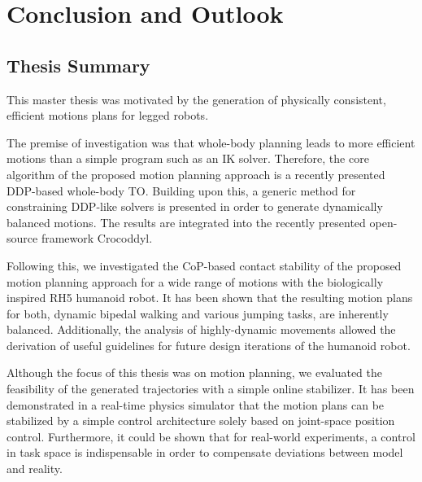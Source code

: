 
\chapter{Conclusion and Outlook}\label{c7}

\section{Thesis Summary}
This master thesis was motivated by the generation of physically consistent, efficient motions plans for legged robots. 

The premise of investigation was that whole-body planning leads to more efficient motions than a simple program such as an \gls{IK} solver. Therefore, the core algorithm of the proposed motion planning approach is a recently presented \gls{DDP}-based whole-body \gls{TO}. Building upon this, a generic method for constraining DDP-like solvers is presented in order to generate dynamically balanced motions. The results are integrated into the recently presented open-source framework Crocoddyl.

Following this, we investigated the \gls{CoP}-based contact stability of the  proposed motion planning approach for a wide range of motions with the biologically inspired RH5 humanoid robot. It has been shown that the resulting motion plans for both, dynamic bipedal walking and various jumping tasks, are inherently balanced. Additionally, the analysis of highly-dynamic movements allowed the derivation of useful guidelines for future design iterations of the humanoid robot.

Although the focus of this thesis was on motion planning, we evaluated the feasibility of the generated trajectories with a simple online stabilizer. It has been demonstrated in a real-time physics simulator that the motion plans can be stabilized by a simple control architecture solely based on joint-space position control. Furthermore, it could be shown that for real-world experiments, a control in task space is indispensable in order to compensate deviations between model and reality. 

